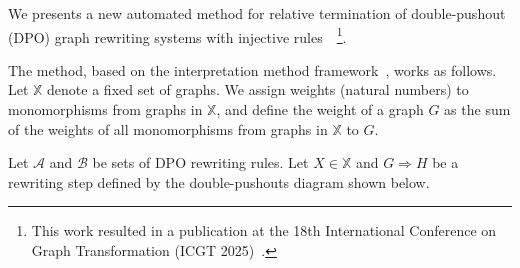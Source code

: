 

We presents a new automated method for relative termination of double-pushout (DPO) graph rewriting systems with injective rules~\cite{corradini1997algebraic,habel2001double,konig2018atutorial}~\footnote{This work resulted in a publication at the 18th International Conference on Graph Transformation (ICGT 2025)~\cite{qiu2025termination_icgt}.}. 

The method, based on the interpretation method framework~\cite{nipkow1998term,contejean2005mechanically}, works as follows. Let \( \mathbb{X} \) denote a fixed set of graphs. We assign weights (natural numbers) to monomorphisms from graphs in \( \mathbb{X} \), and define the weight of a graph $G$ as the sum of the weights of all monomorphisms from graphs in \( \mathbb{X} \) to $G$. 

Let $\mathcal{A}$ and $\mathcal{B}$ be sets of DPO rewriting rules. Let $X \mathop{\in} \mathbb{X}$ and $G \mathop{\Rightarrow} H$ be a rewriting step defined by the double-pushouts diagram shown below. 
\begin{center}
    \end{center}

